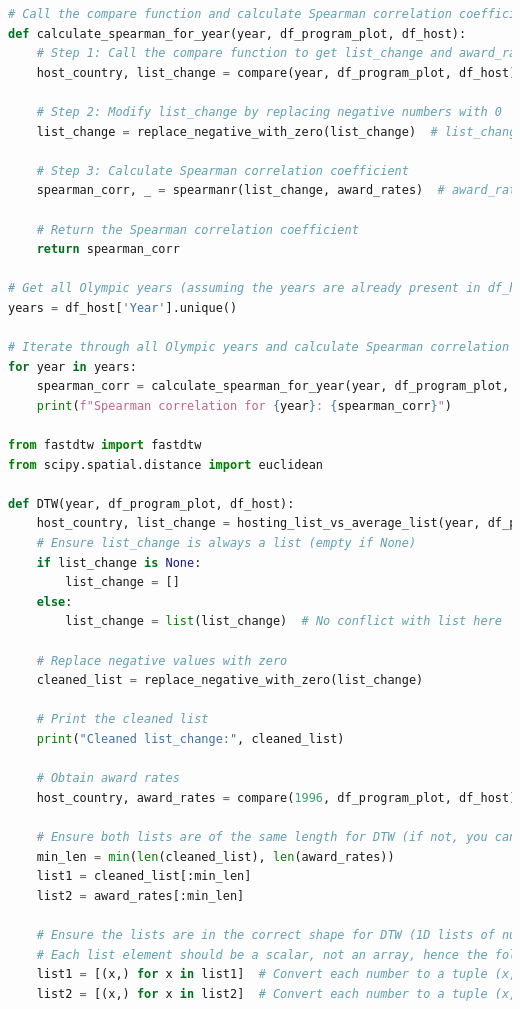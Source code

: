 \documentclass[12pt]{article}
\begin{document}
\begin{lstlisting}[language=Python, style=mystyle, caption=data\_analyze.ipynb]
# Call the compare function and calculate Spearman correlation coefficient
def calculate_spearman_for_year(year, df_program_plot, df_host):
    # Step 1: Call the compare function to get list_change and award_rates
    host_country, list_change = compare(year, df_program_plot, df_host)  # The result includes list_change
    
    # Step 2: Modify list_change by replacing negative numbers with 0
    list_change = replace_negative_with_zero(list_change)  # list_change is a numerical list
    
    # Step 3: Calculate Spearman correlation coefficient
    spearman_corr, _ = spearmanr(list_change, award_rates)  # award_rates is returned from the compare function
    
    # Return the Spearman correlation coefficient
    return spearman_corr

# Get all Olympic years (assuming the years are already present in df_host)
years = df_host['Year'].unique()

# Iterate through all Olympic years and calculate Spearman correlation coefficient
for year in years:
    spearman_corr = calculate_spearman_for_year(year, df_program_plot, df_host)
    print(f"Spearman correlation for {year}: {spearman_corr}")

from fastdtw import fastdtw
from scipy.spatial.distance import euclidean

def DTW(year, df_program_plot, df_host):
    host_country, list_change = hosting_list_vs_average_list(year, df_program_plot, df_host)
    # Ensure list_change is always a list (empty if None)
    if list_change is None:
        list_change = []
    else:
        list_change = list(list_change)  # No conflict with list here

    # Replace negative values with zero
    cleaned_list = replace_negative_with_zero(list_change)

    # Print the cleaned list
    print("Cleaned list_change:", cleaned_list)

    # Obtain award rates
    host_country, award_rates = compare(1996, df_program_plot, df_host)

    # Ensure both lists are of the same length for DTW (if not, you can pad with zeros or truncate)
    min_len = min(len(cleaned_list), len(award_rates))
    list1 = cleaned_list[:min_len]
    list2 = award_rates[:min_len]

    # Ensure the lists are in the correct shape for DTW (1D lists of numbers)
    # Each list element should be a scalar, not an array, hence the following line:
    list1 = [(x,) for x in list1]  # Convert each number to a tuple (x,)
    list2 = [(x,) for x in list2]  # Convert each number to a tuple (x,)


\end{lstlisting}
\end{document}
